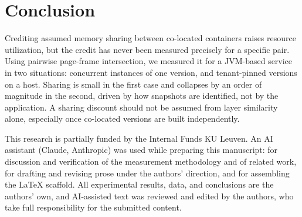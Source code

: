\documentclass[sigplan,10pt,natbib=false]{acmart}
\begin{document}
\section{Conclusion}
\label{sec:conclusion}

Crediting assumed memory sharing between co-located containers raises
resource utilization, but the credit has never been measured precisely
for a specific pair. Using pairwise page-frame intersection, we
measured it for a JVM-based service in two situations: concurrent
instances of one version, and tenant-pinned versions on a host. Sharing
is small in the first case and collapses by an order of magnitude in
the second, driven by how snapshots are identified, not by the
application. A sharing discount should not be assumed from
layer similarity alone, especially once co-located versions are
built independently.

\begin{acks}
This research is partially funded by the Internal Funds KU Leuven. An
AI assistant (Claude, Anthropic) was used while preparing this
manuscript: for discussion and verification of the measurement
methodology and of related work, for drafting and revising prose under
the authors' direction, and for assembling the \LaTeX{} scaffold. All
experimental results, data, and conclusions are the authors' own, and
AI-assisted text was reviewed and edited by the authors, who take full
responsibility for the submitted content.
\end{acks}

{\footnotesize
\printbibliography
}
\end{document}
